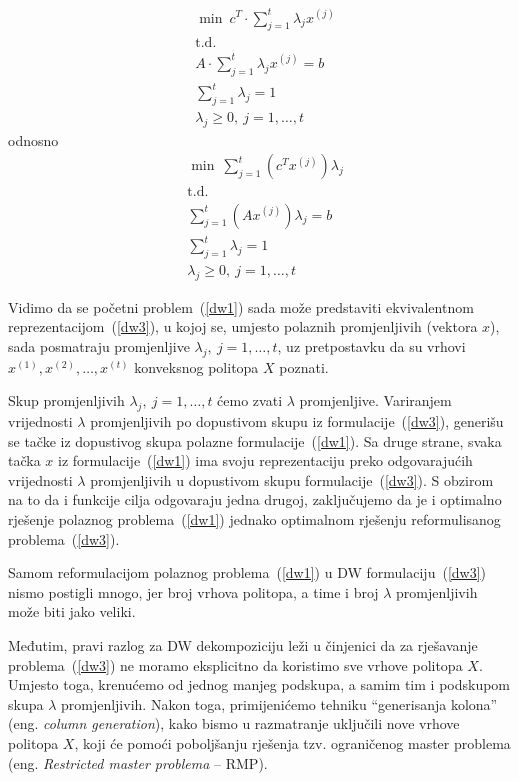 \documentclass[a4paper, utf8, 11pt, colorlinks]{book}
\theoremstyle{definition}
\begin{document}
 
   \begin{equation}
 	\begin{aligned}\label{dw2}
 	&	\min\  c^T\cdot \sum_{j=1}^t\lambda_jx^{(j)}\\
 		&\mbox{t.d.}\\  
 		&A\cdot \sum_{j=1}^t\lambda_jx^{(j)}=b\\
 		 		 &\sum_{j=1}^t\lambda_j = 1\\
 		&\lambda_j\geqslant 0,\ j = 1,\ldots,t
 	\end{aligned}
 \end{equation}
odnosno
    \begin{equation}
 	\begin{aligned}\label{dw3}
 		&\min\  \sum_{j=1}^t(c^T x^{(j)})\lambda_j\\
 			&\mbox{t.d.}\\   
 		&\sum_{j=1}^t (A x^{(j)})\lambda_j=b\\
 		&\sum_{j=1}^t\lambda_j = 1\\
 		&\lambda_j\geqslant 0,\ j = 1,\ldots,t
 	\end{aligned}
 \end{equation}
 
 Vidimo da se početni problem~(\ref{dw1}) sada može predstaviti ekvivalentnom reprezentacijom~(\ref{dw3}), u kojoj se, umjesto polaznih promjenljivih (vektora $x$), sada posmatraju promjenljive $\lambda_j,\ j = 1,\ldots,t$, uz pretpostavku da su  vrhovi $x^{(1)},x^{(2)},\dots,x^{(t)}$ konveksnog politopa $X$ poznati.
 
 Skup promjenljivih $\lambda_j,\ j = 1,\ldots,t$ ćemo zvati $\lambda$ promjenljive.
  Variranjem vrijednosti $\lambda$ promjenljivih po dopustivom skupu iz formulacije~(\ref{dw3}), generišu se tačke iz dopustivog skupa polazne formulacije~(\ref{dw1}). Sa druge strane, svaka tačka $x$ iz formulacije~(\ref{dw1}) ima svoju reprezentaciju preko odgovarajućih vrijednosti  $\lambda$ promjenljivih u dopustivom skupu formulacije~(\ref{dw3}). S obzirom na to da i funkcije cilja odgovaraju jedna drugoj, zaključujemo da je i optimalno rješenje polaznog problema~(\ref{dw1}) jednako optimalnom rješenju reformulisanog problema~(\ref{dw3}).
 
 Samom reformulacijom polaznog problema~(\ref{dw1}) u DW formulaciju~(\ref{dw3}) nismo postigli mnogo, jer broj vrhova politopa, a time i broj $\lambda$ promjenljivih može biti jako veliki.
 
 Međutim, pravi razlog za DW dekompoziciju leži u činjenici da za rješavanje problema~(\ref{dw3}) ne moramo eksplicitno da koristimo sve vrhove politopa $X$. Umjesto toga, krenućemo od jednog   manjeg podskupa, a samim tim i podskupom skupa $\lambda$ promjenljivih. Nakon toga, primijenićemo tehniku ``generisanja kolona'' (eng. \emph{column generation}), kako bismo u razmatranje uključili nove vrhove politopa $X$, koji će pomoći poboljšanju rješenja tzv. ograničenog master problema (eng. \emph{Restricted master problema} -- RMP).
 
\end{document}
